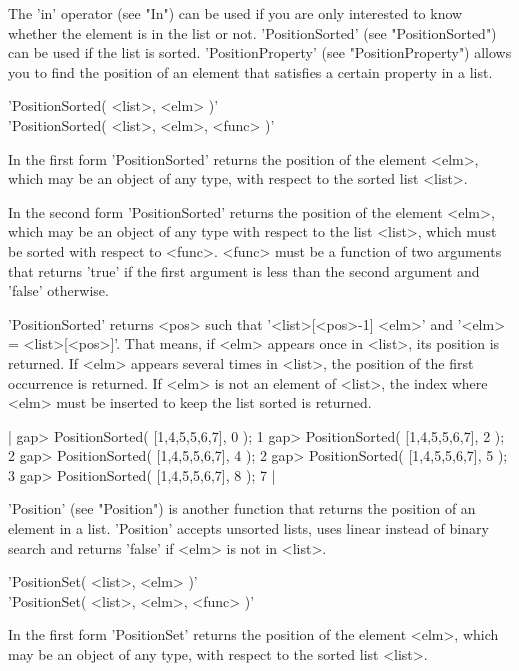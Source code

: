 The 'in'  operator (see "In") can  be used if  you are only interested to
know  whether the element is in  the list  or not.  'PositionSorted' (see
"PositionSorted") can be used if the list  is sorted.  'PositionProperty'
(see "PositionProperty") allows  you to find  the position  of an element
that satisfies a certain property in a list.

%

'PositionSorted( <list>, <elm> )' \\
'PositionSorted( <list>, <elm>, <func> )'

In the first form 'PositionSorted'   returns the position of the  element
<elm>, which may be an  object of  any type, with respect  to  the sorted
list <list>.

In the second form 'PositionSorted' returns  the position of  the element
<elm>,  which may be  an  object of  any type with   respect to  the list
<list>, which must be sorted with respect  to  <func>.  <func> must  be a
function  of  two arguments that returns 'true'  if the first argument is
less than the second argument and 'false' otherwise.

'PositionSorted' returns <pos> such  that '<list>[<pos>-1] \< <elm>'  and
'<elm> \<= <list>[<pos>]'.  That means,  if <elm> appears once in <list>,
its position is returned.  If <elm> appears several  times in <list>, the
position of the first occurrence is returned.  If <elm> is not an element
of <list>, the index where <elm> must be inserted to keep the list sorted
is returned.

|    gap> PositionSorted( [1,4,5,5,6,7], 0 );
    1
    gap> PositionSorted( [1,4,5,5,6,7], 2 );
    2
    gap> PositionSorted( [1,4,5,5,6,7], 4 );
    2
    gap> PositionSorted( [1,4,5,5,6,7], 5 );
    3
    gap> PositionSorted( [1,4,5,5,6,7], 8 );
    7 |

'Position' (see "Position") is another function that returns the position
of an element in a list.  'Position'  accepts unsorted lists, uses linear
instead of binary search and returns 'false' if <elm> is not in <list>.

'PositionSet( <list>, <elm> )' \\
'PositionSet( <list>, <elm>, <func> )'

In the first form 'PositionSet'   returns the position of the  element
<elm>, which may be an  object of  any type, with respect  to  the sorted
list <list>.


